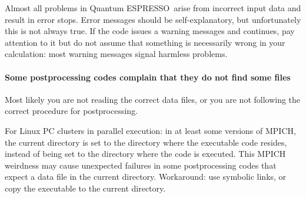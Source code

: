 \documentclass[12pt,a4paper]{article}
\def\qe{{\sc Quantum ESPRESSO}}
\begin{document}
Almost all problems in \qe\ arise from incorrect input data and result in
error stops. Error messages should be self-explanatory, but unfortunately
this is not always true. If the code issues a warning messages and continues,
pay attention to it but do not assume that something is necessarily wrong in
your calculation: most warning messages signal harmless problems.

\paragraph{Some postprocessing codes complain that they do not find some files}
Most likely you are not reading the correct data files, or you are not
following the correct procedure for postprocessing.

For Linux PC clusters in parallel execution: in at least some versions
of MPICH, the current directory is set to the directory where the executable
code resides, instead of being set to the directory where the code is executed.
This MPICH weirdness may cause unexpected failures in some postprocessing
codes that expect a data file in the current directory. Workaround: use
symbolic links, or copy the executable to the current directory.
\end{document}
